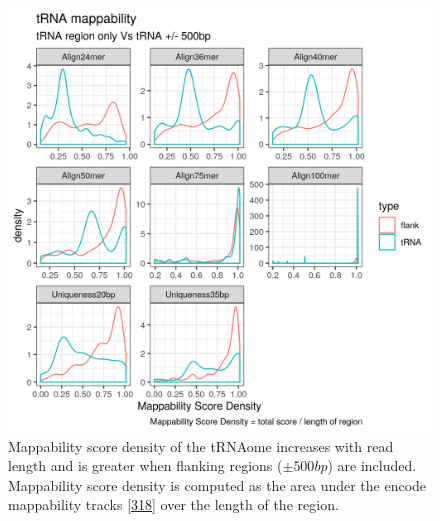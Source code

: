 \documentclass[
]{book}
\begin{document}
\begin{figure}

{\centering \includegraphics[width=1\linewidth]{./figs/mappabilityScoreDensity_tRNAVsFlank500} 

}

\caption{Mappability score density of the tRNAome increases with read length and is greater when flanking regions (\(\pm500bp\)) are included. Mappability score density is computed as the area under the encode mappability tracks {[}\protect\hyperlink{ref-Derrien2012}{318}{]} over the length of the region.}\label{fig:mappabilityScoreDensity}
\end{figure}
\end{document}
